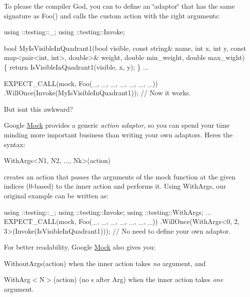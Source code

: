 To please the compiler God, you can to define an \char`\"{}adaptor\char`\"{} that has the same signature as {\ttfamily Foo()} and calls the custom action with the right arguments\+:


\begin{DoxyCode}
using ::testing::\_;
using ::testing::Invoke;

\textcolor{keywordtype}{bool} MyIsVisibleInQuadrant1(\textcolor{keywordtype}{bool} visible, \textcolor{keyword}{const} \textcolor{keywordtype}{string}& name, \textcolor{keywordtype}{int} x, \textcolor{keywordtype}{int} y,
                            \textcolor{keyword}{const} map<pair<int, int>, \textcolor{keywordtype}{double}>& weight,
                            \textcolor{keywordtype}{double} min\_weight, \textcolor{keywordtype}{double} max\_wight) \{
  \textcolor{keywordflow}{return} IsVisibleInQuadrant1(visible, x, y);
\}
...

  EXPECT\_CALL(mock, Foo(\_, \_, \_, \_, \_, \_, \_))
      .WillOnce(Invoke(MyIsVisibleInQuadrant1));  \textcolor{comment}{// Now it works.}
\end{DoxyCode}


But isn\textquotesingle{}t this awkward?

Google \hyperlink{classMock}{Mock} provides a generic {\itshape action adaptor}, so you can spend your time minding more important business than writing your own adaptors. Here\textquotesingle{}s the syntax\+:


\begin{DoxyCode}
WithArgs<N1, N2, ..., Nk>(action)
\end{DoxyCode}


creates an action that passes the arguments of the mock function at the given indices (0-\/based) to the inner {\ttfamily action} and performs it. Using {\ttfamily With\+Args}, our original example can be written as\+:


\begin{DoxyCode}
using ::testing::\_;
using ::testing::Invoke;
using ::testing::WithArgs;
...
  EXPECT\_CALL(mock, Foo(\_, \_, \_, \_, \_, \_, \_))
      .WillOnce(WithArgs<0, 2, 3>(Invoke(IsVisibleInQuadrant1)));
      \textcolor{comment}{// No need to define your own adaptor.}
\end{DoxyCode}


For better readability, Google \hyperlink{classMock}{Mock} also gives you\+:


\begin{DoxyItemize}
\item {\ttfamily Without\+Args(action)} when the inner {\ttfamily action} takes {\itshape no} argument, and
\item {\ttfamily With\+Arg$<$N$>$(action)} (no {\ttfamily s} after {\ttfamily Arg}) when the inner {\ttfamily action} takes {\itshape one} argument.
\end{DoxyItemize}

